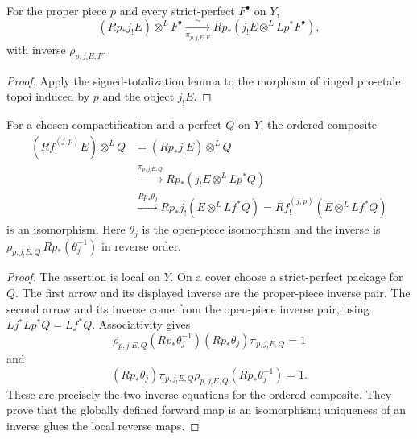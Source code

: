 \begin{lemma}
\label{lemma:weil-pbc-projection-formula-proper-piece}
For the proper piece $p$ and every strict-perfect $F^\bullet$ on $Y$,
\[
 (Rp_*j_!E)\otimes^LF^\bullet
 \xrightarrow[\pi_{p,j_!E,F}]{\sim}
 Rp_*(j_!E\otimes^LLp^*F^\bullet),
\]
with inverse $\rho_{p,j_!E,F}$.
\end{lemma}
\begin{proof}

Apply the signed-totalization lemma to the morphism of ringed pro-etale
topoi induced by $p$ and the object $j_!E$.
\end{proof}

\begin{lemma}
\label{lemma:weil-pbc-projection-formula-compactified}
\uses{}

For a chosen compactification and a perfect $Q$ on $Y$, the ordered composite
\[
\begin{aligned}
 (Rf_!^{(j,p)}E)\otimes^LQ
 &=(Rp_*j_!E)\otimes^LQ\\
 &\xrightarrow{\pi_{p,j_!E,Q}}
 Rp_*(j_!E\otimes^LLp^*Q)\\
 &\xrightarrow{Rp_*\theta_j}
 Rp_*j_!(E\otimes^LLf^*Q)
 =Rf_!^{(j,p)}(E\otimes^LLf^*Q)
\end{aligned}
\]
is an isomorphism.  Here $\theta_j$ is the open-piece isomorphism and the
inverse is $\rho_{p,j_!E,Q}\,Rp_*(\theta_j^{-1})$ in reverse order.
\end{lemma}
\begin{proof}

The assertion is local on $Y$.  On a cover choose a strict-perfect package
for $Q$.  The first arrow and its displayed inverse are the proper-piece
inverse pair.  The second arrow and its inverse come from the open-piece
inverse pair, using
$Lj^*Lp^*Q=Lf^*Q$.  Associativity gives
\[
 \rho_{p,j_!E,Q}(Rp_*\theta_j^{-1})
 (Rp_*\theta_j)\pi_{p,j_!E,Q}=1
\]
and
\[
 (Rp_*\theta_j)\pi_{p,j_!E,Q}
 \rho_{p,j_!E,Q}(Rp_*\theta_j^{-1})=1.
\]
These are precisely the two inverse equations for the ordered composite.
They prove that the globally defined forward map is an isomorphism; uniqueness
of an inverse glues the local reverse maps.
\end{proof}

